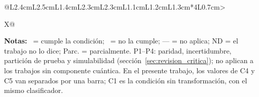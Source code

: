 \begin{landscape}
\begin{table}[htbp]
\begin{tabularx}{\linewidth}{@{}L{2.4cm}L{2.5cm}L{1.4cm}L{2.3cm}L{2.3cm}L{1.1cm}L{1.2cm}L{1.3cm}*{4}{L{0.7cm}}>{\raggedright\arraybackslash}X@{}}
\bottomrule
\end{tabularx}

\vspace{4pt}
\scriptsize
\textbf{Notas:}
\cmark\ = cumple la condición;\quad
\xmark\ = no la cumple;\quad
--- = no aplica;\quad
ND = el trabajo no lo dice;\quad
Parc. = parcialmente.
P1--P4: paridad, incertidumbre, partición de prueba y simulabilidad (sección~\ref{sec:revision_critica}); no aplican a los trabajos sin componente cuántica.
En el presente trabajo, los valores de C4 y C5 van separados por una barra; C1 es la condición sin transformación, con el mismo clasificador.
\end{table}
\end{landscape}

